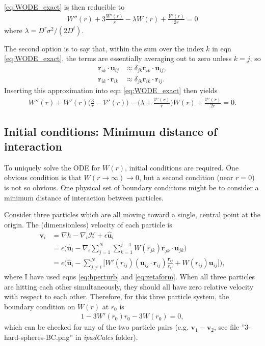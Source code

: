 \documentclass{article}
\begin{document}
\ref{eq:WODE_exact} is then reducible to
\begin{align}
  W''(r)+3\frac{W'(r)}{r}-\lambda W(r)+\frac{\mathcal{V}'(r)}{2r}=0
\end{align}
where $\lambda=D^r\sigma^2/(2D^t)$.

The second option is to say that, within the sum over the index $k$ in eqn
\ref{eq:WODE_exact}, the terms are essentially averaging out to zero unless $k=j$,
so
\begin{align}
  \bm{r}_{ik}\cdot\bm{u}_{ij}&\approx\delta_{jk}\bm{r}_{ik}\cdot\bm{u}_{ij},\\
  \bm{r}_{ik}\cdot\bm{r}_{ik}&\approx\delta_{jk}\bm{r}_{ik}\cdot\bm{r}_{ij}.
\end{align}
Inserting this approximation into eqn \ref{eq:WODE_exact} then yields
\begin{align}
  W''(r)+W'(r)\bigg(\frac{3}{r}-\mathcal{V}'(r)\bigg)-\bigg(\lambda
  + \frac{\mathcal{V}'(r)}{r}\bigg) W(r)+\frac{\mathcal{V}'(r)}{2r}=0.
\end{align}

\subsection{Initial conditions: Minimum distance of interaction}

To uniquely solve the ODE for $W(r)$, initial conditions are required. One obvious condition
is that $W(r\to\infty)\to0$, but a second condition (near $r=0$) is not so obvious. One
physical set of boundary conditions might be to consider a minimum distance of interaction
between particles.

Consider three particles which are all moving toward a single, central point at the origin.
The (dimensionless) velocity of each particle is
\begin{align}
  \bm{v}_i&=\nabla h -\nabla_i\mathcal{H} + \epsilon \bm{\hat{u}}_i\nonumber\\
          &=\epsilon \bigg(\bm{\hat{u}}_i-\nabla_i\sum_{j=1}^N\sum_{k=1}^{j-1}W(r_{jk})
            \bm{r}_{jk}\cdot\bm{u}_{jk}\bigg)\nonumber\\
          &=\epsilon \bigg(\bm{\hat{u}}_i-\sum_{j\neq i}^N \bigg[W'(r_{ij})
            (\bm{u}_{ij}\cdot\bm{r}_{ij})\frac{\bm{r}_{ij}}{r_{ij}}
            +W(r_{ij})\bm{u}_{ij}\bigg]\bigg),
\end{align}
where I have used eqns \ref{eq:hperturb} and \ref{eq:zetaform}. When all three particles are
hitting each other simultaneously, they should all have zero relative velocity with respect
to each other. Therefore, for this three particle system, the boundary condition on $W(r)$
at $r_0$ is
\begin{align}
  1-3W'(r_0)r_0-3W(r_0)=0,
\end{align}
which can be checked for any of the two particle pairs (e.g. $\bm{v}_1-\bm{v}_2$, see file
''3-hard-spheres-BC.png'' in \textit{ipadCalcs} folder).
\end{document}
